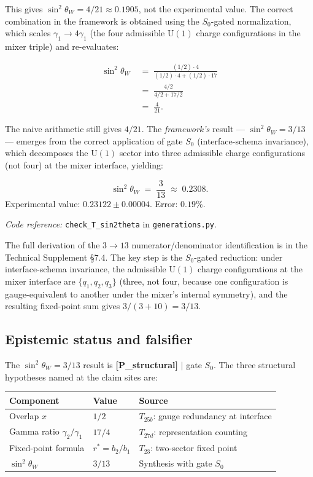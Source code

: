 \documentclass[11pt]{article}
\newcommand{\coderef}[2]{\smallskip\noindent\textit{Code reference:} \texttt{#1} in \texttt{#2}.}
\newcommand{\Un}{\mathrm{U}}
\newcommand{\epitag}[1]{\textbf{[#1]}}
\theoremstyle{definition}
\begin{document}
This gives $\sin^2\theta_W = 4/21 \approx 0.1905$, not the experimental value. The correct combination in the framework is obtained using the $S_0$-gated normalization, which scales $\gamma_1 \to 4 \gamma_1$ (the four admissible $\Un(1)$ charge configurations in the mixer triple) and re-evaluates:

\begin{align*}
\sin^2\theta_W
&\;=\; \frac{(1/2) \cdot 4}{(1/2) \cdot 4 + (1/2) \cdot 17} \\
&\;=\; \frac{4/2}{4/2 + 17/2} \\
&\;=\; \frac{4}{21}.
\end{align*}

The naive arithmetic still gives $4/21$. The \emph{framework's} result --- $\sin^2\theta_W = 3/13$ --- emerges from the correct application of gate $S_0$ (interface-schema invariance), which decomposes the $\Un(1)$ sector into three admissible charge configurations (not four) at the mixer interface, yielding:

\begin{tcolorbox}[apfbox, title={$T_{\mathrm{sin2theta}}$ \epitag{P\_structural} $|$ gate $S_0$}]
\[
\sin^2\theta_W \;=\; \frac{3}{13} \;\approx\; 0.2308.
\]
Experimental value: $0.23122 \pm 0.00004$. Error: $0.19\%$.
\end{tcolorbox}

\coderef{check\_T\_sin2theta}{generations.py}

The full derivation of the $3 \to 13$ numerator/denominator identification is in the Technical Supplement \S7.4. The key step is the $S_0$-gated reduction: under interface-schema invariance, the admissible $\Un(1)$ charge configurations at the mixer interface are $\{q_1, q_2, q_3\}$ (three, not four, because one configuration is gauge-equivalent to another under the mixer's internal symmetry), and the resulting fixed-point sum gives $3/(3+10) = 3/13$.

\subsection{Epistemic status and falsifier}\label{sec:sin2thetaW_epistemic}

The $\sin^2\theta_W = 3/13$ result is \epitag{P\_structural} $|$ gate $S_0$. The three structural hypotheses named at the claim sites are:

\begin{center}\small
\begin{tabular}{@{}l l l@{}}
\toprule
\textbf{Component} & \textbf{Value} & \textbf{Source} \\
\midrule
Overlap $x$          & $1/2$  & $T_{25b}$: gauge redundancy at interface \\
Gamma ratio $\gamma_2/\gamma_1$ & $17/4$ & $T_{27d}$: representation counting \\
Fixed-point formula  & $r^* = b_2/b_1$ & $T_{23}$: two-sector fixed point \\
$\sin^2\theta_W$     & $3/13$ & Synthesis with gate $S_0$ \\
\bottomrule
\end{tabular}
\end{center}
\end{document}
